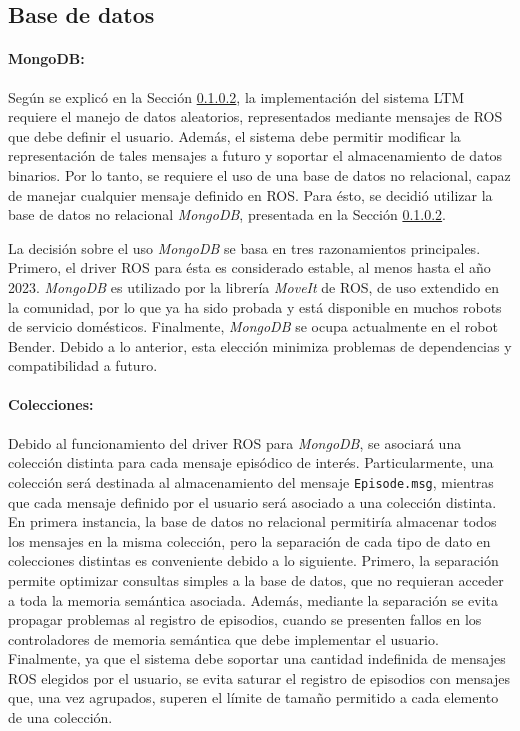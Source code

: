\subsection{Base de datos}

\paragraph{MongoDB:}
Según se explicó en la Sección \ref{}, la implementación del sistema LTM requiere el manejo de datos aleatorios, representados mediante mensajes de ROS que debe definir el usuario. Además, el sistema debe permitir modificar la representación de tales mensajes a futuro y soportar el almacenamiento de datos binarios. Por lo tanto, se requiere el uso de una base de datos no relacional, capaz de manejar cualquier mensaje definido en ROS. Para ésto, se decidió utilizar la base de datos no relacional \textit{MongoDB}, presentada en la Sección \ref{}. 

La decisión sobre el uso \textit{MongoDB} se basa en tres razonamientos principales. Primero, el driver ROS para ésta es considerado estable, al menos hasta el año 2023. \textit{MongoDB} es utilizado por la librería \textit{MoveIt} de ROS, de uso extendido en la comunidad, por lo que ya ha sido probada y está disponible en muchos robots de servicio domésticos. Finalmente, \textit{MongoDB} se ocupa actualmente en el robot Bender. Debido a lo anterior, esta elección minimiza problemas de dependencias y compatibilidad a futuro.



\paragraph{Colecciones:}
Debido al funcionamiento del driver ROS para \textit{MongoDB}, se asociará una colección distinta para cada mensaje episódico de interés. Particularmente, una colección será destinada al almacenamiento del mensaje \texttt{Episode.msg}, mientras que cada mensaje definido por el usuario será  asociado a una colección distinta. En primera instancia, la base de datos no relacional permitiría almacenar todos los mensajes en la misma colección, pero la separación de cada tipo de dato en colecciones distintas es conveniente debido a lo siguiente. Primero, la separación permite optimizar consultas simples a la base de datos, que no requieran acceder a toda la memoria semántica asociada. Además, mediante la separación se evita propagar problemas al registro de episodios, cuando se presenten fallos en los controladores de memoria semántica que debe implementar el usuario. Finalmente, ya que el sistema debe soportar una cantidad indefinida de mensajes ROS elegidos por el usuario, se evita saturar el registro de episodios con mensajes que, una vez agrupados, superen el límite de tamaño permitido a cada elemento de una colección.

